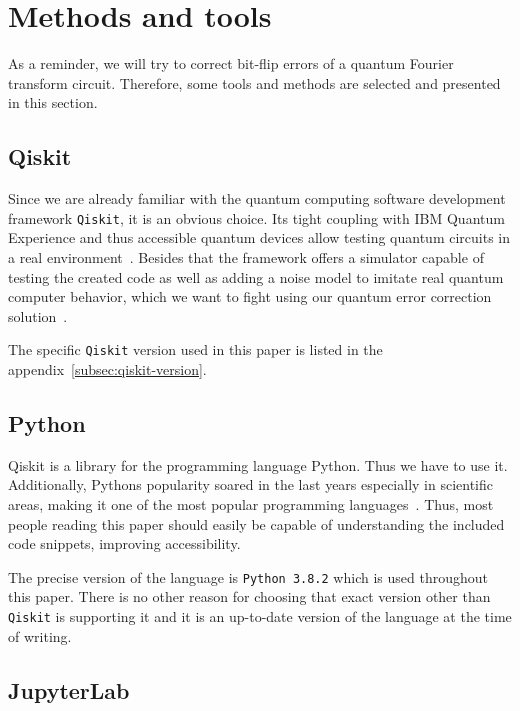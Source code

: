 \section{Methods and tools}
\label{sec:methods-and-tools}

As a reminder, we will try to correct bit-flip errors of a quantum Fourier transform circuit.
Therefore, some tools and methods are selected and presented in this section.

\subsection{Qiskit}
\label{subsec:qiskit}

Since we are already familiar with the quantum computing software development framework \texttt{Qiskit}, it is an obvious choice.
Its tight coupling with IBM Quantum Experience and thus accessible quantum devices allow testing quantum circuits in a real environment~\cite{IBMQAccount}.
Besides that the framework offers a simulator capable of testing the created code as well as adding a noise model to imitate real quantum computer behavior, which we want to fight using our quantum error correction solution~\cite{QiskitNoiseModel}.

The specific \texttt{Qiskit} version used in this paper is listed in the appendix~\ref{subsec:qiskit-version}.

\subsection{Python}
\label{subsec:python}

Qiskit is a library for the programming language Python.
Thus we have to use it.
Additionally, Pythons popularity soared in the last years especially in scientific areas, making it one of the most popular programming languages~\cite{StackOverFlowDevSurveyTechnolgies}.
Thus, most people reading this paper should easily be capable of understanding the included code snippets, improving accessibility.

The precise version of the language is \texttt{Python 3.8.2} which is used throughout this paper.
There is no other reason for choosing that exact version other than \texttt{Qiskit} is supporting it and it is an up-to-date version of the language at the time of writing.

\subsection{JupyterLab}
\label{subsec:jupyter-lab}

